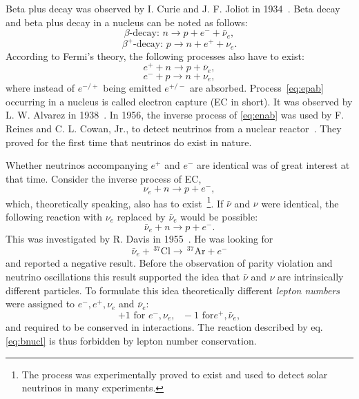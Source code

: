 Beta plus decay was observed by I. Curie and J. F. Joliot in 1934~\cite{Cur34}. Beta decay and beta plus decay in a nucleus can be noted as follows:
\begin{equation}
  \label{eq:bd}
  \beta\mbox{-decay: } n \rightarrow p+e^{-}+\bar{\nu}_e ,
\end{equation}
\begin{equation}
  \label{eq:bpd}
  \beta^+\mbox{-decay: } p \rightarrow n+e^{+}+\nu_e .
\end{equation}
According to Fermi's theory, the following processes also have to exist:
\begin{equation}
  \label{eq:enab}
  e^{+} + n \rightarrow p + \bar{\nu}_e ,
\end{equation}
\begin{equation}
  \label{eq:epab}
  e^{-} + p \rightarrow n + \nu_e ,
\end{equation}
where instead of $e^{-/+}$ being emitted $e^{+/-}$ are absorbed. Process~\ref{eq:epab} occurring in a nucleus is called electron capture (EC in short). It was observed by L. W. Alvarez in 1938~\cite{Alv38}. In 1956, the inverse process of \ref{eq:enab} was used by F. Reines and C. L. Cowan, Jr., to detect neutrinos from a nuclear reactor~\cite{Cow56, Rei56}. They proved for the first time that neutrinos do exist in nature.

Whether neutrinos accompanying $e^{+}$ and $e^{-}$ are identical was of great interest at that time. Consider the inverse process of EC,
\begin{equation}
  \label{eq:nunab}
  \nu_e + n \rightarrow p + e^{-} ,
\end{equation}
which, theoretically speaking, also has to exist~\footnote{The process was experimentally proved to exist and used to detect solar neutrinos in many experiments.}. If $\bar{\nu}$ and $\nu$ were identical, the following reaction with $\nu_e$ replaced by $\bar{\nu}_{e}$ would be possible:
\begin{equation}
  \label{eq:bnun}
  \bar{\nu}_e + n \rightarrow p + e^{-}.
\end{equation}
This was investigated by R. Davis in 1955~\cite{Dav55,Dav56}. He was looking for
\begin{equation}
  \label{eq:bnucl}
  \bar{\nu}_e + \, ^{37} \! \text{Cl} \rightarrow \, ^{37} \! \text{Ar} + e^{-}
\end{equation}
and reported a negative result. Before the observation of parity violation and neutrino oscillations this result supported the idea that $\bar{\nu}$ and $\nu$ are intrinsically different particles. To formulate this idea theoretically different \emph{lepton numbers} were assigned to $e^{-}, e^{+}, \nu_e$ and $\bar{\nu}_e$:
\begin{equation}
  \label{eq:ln}
  +1 \mbox{ for }e^{-}, \nu_e, \mbox{   }-1 \mbox{ for
}e^{+},\bar{\nu}_e,
\end{equation}
and required to be conserved in interactions. The reaction described by eq. \ref{eq:bnucl} is thus forbidden by lepton number conservation.

